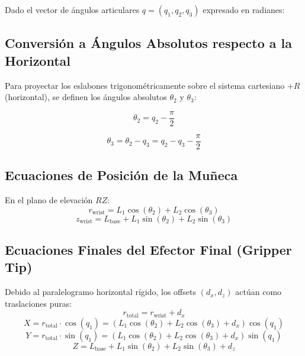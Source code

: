 \documentclass[12pt,letterpaper]{article}
\begin{document}
Dado el vector de ángulos articulares $q = (q_1, q_2, q_3)$ expresado en radianes:

\subsection{Conversión a Ángulos Absolutos respecto a la Horizontal}

Para proyectar los eslabones trigonométricamente sobre el sistema cartesiano $+R$ (horizontal), se definen los ángulos absolutos $\theta_2$ y $\theta_3$:

\begin{equation}
\theta_2 = q_2 - \frac{\pi}{2}
\end{equation}

\begin{equation}
\theta_3 = \theta_2 - q_3 = q_2 - q_3 - \frac{\pi}{2}
\end{equation}

\subsection{Ecuaciones de Posición de la Muñeca}

En el plano de elevación $RZ$:
\begin{equation}
r_{\text{wrist}} = L_1 \cos(\theta_2) + L_2 \cos(\theta_3)
\end{equation}
\begin{equation}
z_{\text{wrist}} = L_{\text{base}} + L_1 \sin(\theta_2) + L_2 \sin(\theta_3)
\end{equation}

\subsection{Ecuaciones Finales del Efector Final (Gripper Tip)}

Debido al paralelogramo horizontal rígido, los offsets $(d_x, d_z)$ actúan como traslaciones puras:
\begin{equation}
r_{\text{total}} = r_{\text{wrist}} + d_x
\end{equation}
\begin{equation}
X = r_{\text{total}} \cdot \cos(q_1) = \left( L_1 \cos(\theta_2) + L_2 \cos(\theta_3) + d_x \right) \cos(q_1)
\end{equation}
\begin{equation}
Y = r_{\text{total}} \cdot \sin(q_1) = \left( L_1 \cos(\theta_2) + L_2 \cos(\theta_3) + d_x \right) \sin(q_1)
\end{equation}
\begin{equation}
Z = L_{\text{base}} + L_1 \sin(\theta_2) + L_2 \sin(\theta_3) + d_z
\end{equation}
\end{document}
